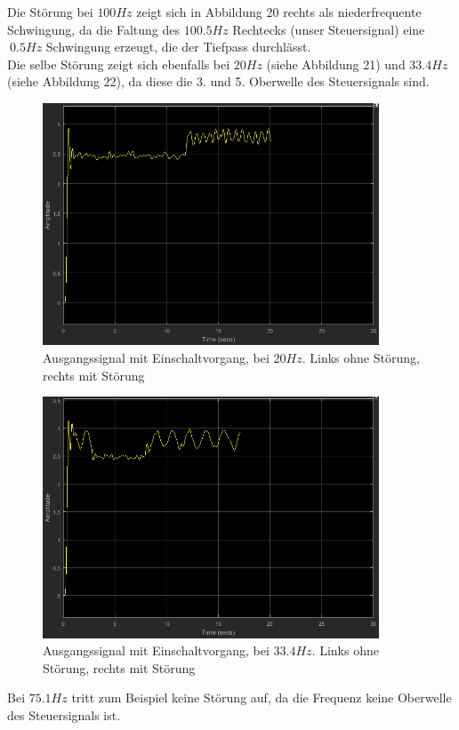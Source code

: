 \documentclass[a4paper,12pt]{article}
\begin{document}
	\noindent
	Die Störung bei $100Hz$ zeigt sich in Abbildung 20 rechts als niederfrequente Schwingung, da die Faltung des $100.5Hz$ Rechtecks (unser Steuersignal) eine $~0.5Hz$ Schwingung erzeugt, die der Tiefpass durchlässt.\\ \newline
	Die selbe Störung zeigt sich ebenfalls bei $20Hz$ (siehe Abbildung 21) und $33.4Hz$ (siehe Abbildung 22), da diese die 3. und 5. Oberwelle des Steuersignals sind.
	\begin{figure}[H]
		\centering
		\includegraphics[width=10cm]{assets/pssg-20Hz}
		\caption{Ausgangssignal mit Einschaltvorgang, bei $20Hz$. Links ohne Störung, rechts mit Störung}
	\end{figure}
	\begin{figure}[H]
		\centering
		\includegraphics[width=10cm]{assets/pssg-33_4Hz}
		\caption{Ausgangssignal mit Einschaltvorgang, bei $33.4Hz$. Links ohne Störung, rechts mit Störung}
	\end{figure}
	\noindent
	Bei $75.1Hz$ tritt zum Beispiel keine Störung auf, da die Frequenz keine Oberwelle des Steuersignals ist.\newline
\end{document}

